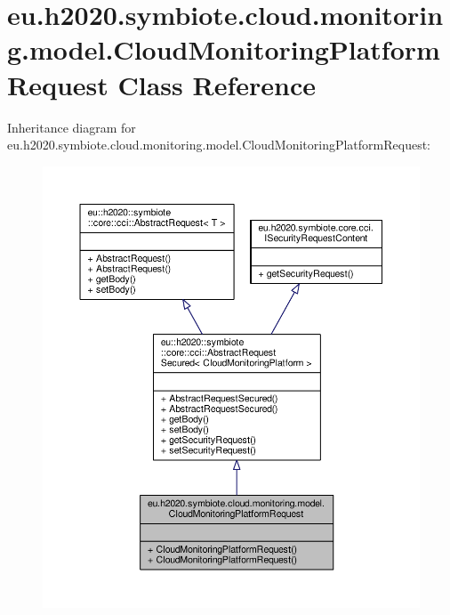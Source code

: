 \hypertarget{classeu_1_1h2020_1_1symbiote_1_1cloud_1_1monitoring_1_1model_1_1CloudMonitoringPlatformRequest}{}\section{eu.\+h2020.\+symbiote.\+cloud.\+monitoring.\+model.\+Cloud\+Monitoring\+Platform\+Request Class Reference}
\label{classeu_1_1h2020_1_1symbiote_1_1cloud_1_1monitoring_1_1model_1_1CloudMonitoringPlatformRequest}


Inheritance diagram for eu.\+h2020.\+symbiote.\+cloud.\+monitoring.\+model.\+Cloud\+Monitoring\+Platform\+Request\+:
\nopagebreak
\begin{figure}[H]
\begin{center}
\leavevmode
\includegraphics[width=350pt]{classeu_1_1h2020_1_1symbiote_1_1cloud_1_1monitoring_1_1model_1_1CloudMonitoringPlatformRequest__inherit__graph}
\end{center}
\end{figure}


